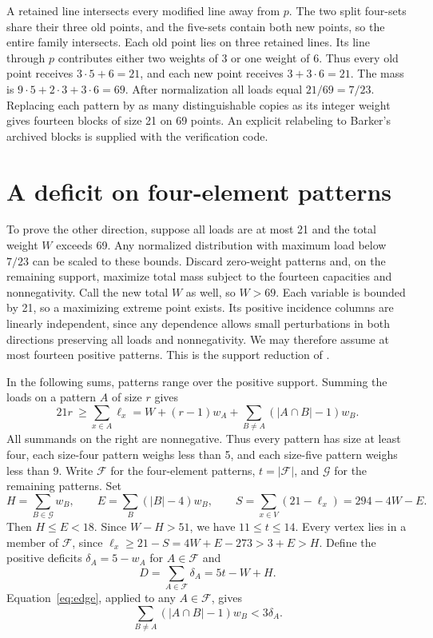 \documentclass[11pt]{article}
\newcommand{\F}{\mathcal F}
\newcommand{\G}{\mathcal G}
\begin{document}
A retained line intersects every modified line away from \(p\).
The two split four-sets share their three old points, and the five-sets
contain both new points, so the entire family intersects. Each old point lies on three retained lines. Its line through \(p\)
contributes either two weights of 3 or one weight of 6. Thus every old
point receives \(3\cdot5+6=21\), and each new point receives
\(3+3\cdot6=21\). The mass is \(9\cdot5+2\cdot3+3\cdot6=69\).
After normalization all loads equal \(21/69=7/23\). Replacing each
pattern by as many distinguishable copies as its integer weight gives
fourteen blocks of size 21 on 69 points. An explicit relabeling to
Barker's archived blocks is supplied with the verification code.

\section{A deficit on four-element patterns}
To prove the other direction, suppose all loads are at most 21 and the
total weight \(W\) exceeds 69. Any normalized distribution with maximum
load below \(7/23\) can be scaled to these bounds. Discard zero-weight patterns and, on the remaining support, maximize
total mass subject to the fourteen capacities and nonnegativity. Call the new total \(W\) as well, so \(W>69\). Each
variable is bounded by 21, so a maximizing extreme point exists. Its
positive incidence columns are linearly independent, since any dependence
allows small perturbations in both directions preserving all loads and
nonnegativity. We may therefore assume at most fourteen positive
patterns. This is the support reduction of \cite[Lemma 3.2]{hhs}.

In the following sums, patterns range over the positive support. Summing the loads on a pattern \(A\) of size \(r\) gives
\begin{equation}\label{eq:edge}
21r\ \ge\sum_{x\in A}\ell_x
= W+(r-1)w_A+\sum_{B\ne A} (|A\cap B|-1)w_B .
\end{equation}
All summands on the right are nonnegative. Thus every pattern has size
at least four, each size-four pattern weighs less than 5, and each
size-five pattern weighs less than 9. Write \(\F\) for the four-element
patterns, \(t=|\F|\), and \(\G\) for the remaining patterns. Set
\[
 H=\sum_{B\in\G}w_B,\qquad E=\sum_B(|B|-4)w_B,\qquad
 S=\sum_{x\in V}(21-\ell_x)=294-4W-E .
\]
Then \(H\le E<18\). Since \(W-H>51\), we have \(11\le t\le14\).
Every vertex lies in a member of \(\F\), since
\(\ell_x\ge21-S=4W+E-273>3+E>H\).
Define the positive deficits \(\delta_A=5-w_A\) for \(A\in\F\) and
\[
 D=\sum_{A\in\F}\delta_A=5t-W+H .
\]
Equation~\eqref{eq:edge}, applied to any \(A\in\F\), gives
\begin{equation}\label{eq:repeats}
 \sum_{B\ne A} (|A\cap B|-1)w_B < 3\delta_A .
\end{equation}
\end{document}
